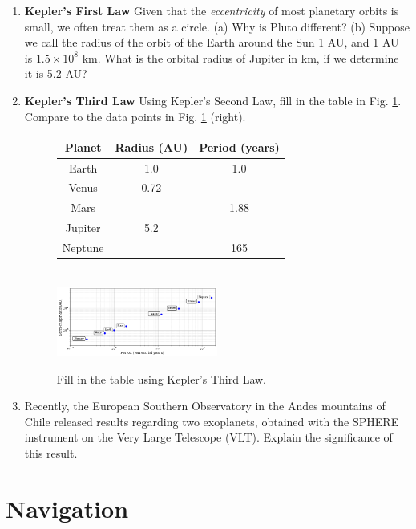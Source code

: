 \documentclass[10pt]{article}
\begin{document}
\begin{enumerate}
\item \textbf{Kepler's First Law} Given that the \textit{eccentricity} of most planetary orbits is small, we often treat them as a circle.  (a) Why is Pluto different? (b) Suppose we call the radius of the orbit of the Earth around the Sun 1 AU, and 1 AU is $1.5\times 10^8$ km.  What is the orbital radius of Jupiter in km, if we determine it is 5.2 AU? \\ \vspace{3cm}
\item \textbf{Kepler's Third Law} Using Kepler's Second Law, fill in the table in Fig. \ref{fig:plan}.  Compare to the data points in Fig. \ref{fig:plan} (right).
\begin{figure}[hb]
\centering
\begin{tabular}{| c | c | c |}
\hline
Planet & Radius (AU) & Period (years) \\ \hline
Earth & 1.0 & 1.0 \\ \hline
Venus & 0.72 &  \\ \hline
Mars & & 1.88 \\ \hline
Jupiter & 5.2 & \\ \hline
Neptune & & 165 \\ \hline
\end{tabular} \\
\includegraphics[width=0.5\textwidth]{figures/planets.png}
\caption{\label{fig:plan} Fill in the table using Kepler's Third Law.}
\end{figure}
\item Recently, the European Southern Observatory in the Andes mountains of Chile released results regarding two exoplanets, obtained with the SPHERE instrument on the Very Large Telescope (VLT).  Explain the significance of this result. \\ \vspace{3cm}
\end{enumerate}

\section{Navigation}
\end{document}
